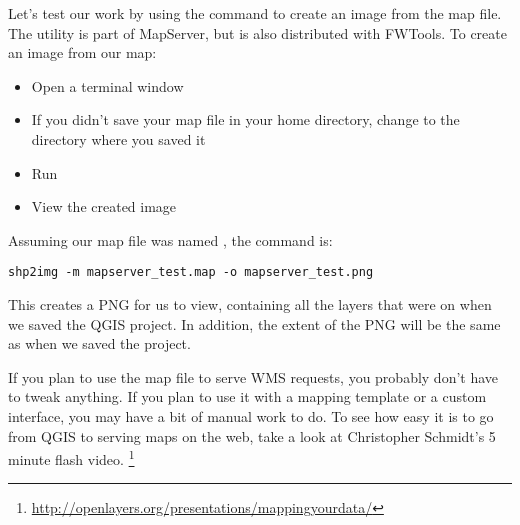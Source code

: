 Let's test our work by using the  command to create an image
from the map file. The   utility is part of MapServer,
but is also distributed with FWTools. To create an image from our map:

\begin{itemize}
\item Open a terminal window
\item If you didn't save your map file in your home directory, change to
  the directory where you saved it
\item Run  
\item View the created image 
\end{itemize}
 
Assuming our map file was named , the
 command is:

\begin{verbatim}
shp2img -m mapserver_test.map -o mapserver_test.png
\end{verbatim}

This creates a PNG for us to view, containing all the layers that were on
when we saved the QGIS project. In addition, the extent of the PNG will be the same as
when we saved the project.

If you plan to use the map file to serve WMS requests, you probably don't
have to tweak anything. If you plan to use it with a mapping template or a
custom interface, you may have a bit of manual work to do. To see how easy
it is to go from QGIS to serving maps on the web, take a look at
Christopher Schmidt's 5 minute flash video.
\footnote{\url{http://openlayers.org/presentations/mappingyourdata/}}
